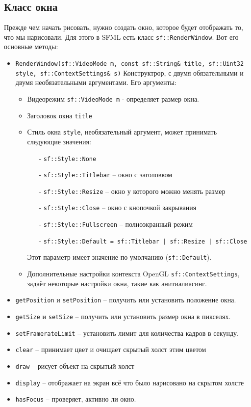 \documentclass{article}
\begin{document}
\subsection*{Класс окна}
Прежде чем начать рисовать, нужно создать окно, которое будет отображать то, что мы нарисовали. Для этого в SFML есть класс \texttt{sf::RenderWindow}. Вот его основные методы:
\begin{itemize}
\item \texttt{RenderWindow(sf::VideoMode m, const sf::String\& title, sf::Uint32 style, sf::ContextSettings\& s)}
Конструктрор, с двумя обязательными и двумя необязательными аргументами. Его аргументы:
\begin{itemize}
\item Видеорежим \texttt{sf::VideoMode m} - определяет размер окна.
\item Заголовок окна \texttt{title}
\item Стиль окна \texttt{style}, необязательный аргумент, может принимать следующие значения:
\begin{itemize}
\item[-] \texttt{sf::Style::None}
\item[-] \texttt{sf::Style::Titlebar} -- окно с заголовком
\item[-] \texttt{sf::Style::Resize}  -- окно у которого можно менять размер
\item[-] \texttt{sf::Style::Close} -- окно с кнопочкой закрывания
\item[-] \texttt{sf::Style::Fullscreen} -- полноэкранный режим
\item[-] \texttt{sf::Style::Default = sf::Titlebar | sf::Resize | sf::Close} 
\end{itemize}
Этот параметр имеет значение по умолчанию (\texttt{sf::Default}).

\item Дополнительные настройки контекста OpenGL \texttt{sf::ContextSettings}, задаёт некоторые настройки окна, такие как анитиалиасинг.
\end{itemize}

\item \texttt{getPosition} и \texttt{setPosition} -- получить или установить положение окна.
\item \texttt{getSize} и \texttt{setSize} -- получить или установить размер окна в пикселях.
\item \texttt{setFramerateLimit} -- установить лимит для количества кадров в секунду.
\item \texttt{clear} -- принимает цвет и очищает скрытый холст этим цветом
\item \texttt{draw} -- рисует объект на скрытый холст
\item \texttt{display} -- отображает на экран всё что было нарисовано на скрытом холсте
\item \texttt{hasFocus} -- проверяет, активно ли окно.
\end{itemize}
\end{document}

